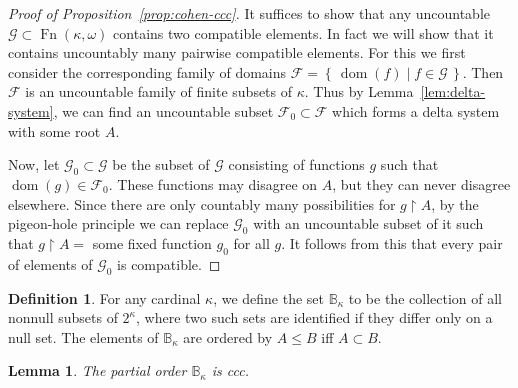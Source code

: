 \documentclass[11pt,oneside]{amsbook}
\newcommand{\set}[1]{\left\{\,#1\,\right\}}
\DeclareMathOperator{\dom}{dom}
\DeclareMathOperator{\Fn}{Fn}
\theoremstyle{definition}
\theoremstyle{plain}
\newtheorem{lem}[thm]{Lemma}
\theoremstyle{definition}
\newtheorem{defn}[thm]{Definition}
\theoremstyle{remark}
\begin{document}
\begin{proof}[Proof of Proposition~\ref{prop:cohen-ccc}]
  It suffices to show that any uncountable $\mathcal G\subset\Fn(\kappa,\omega)$ contains two compatible elements. In fact we will show that it contains uncountably many pairwise compatible elements. For this we first consider the corresponding family of domains $\mathcal F=\set{\dom(f)\mid f\in\mathcal G}$. Then $\mathcal F$ is an uncountable family of finite subsets of $\kappa$. Thus by Lemma~\ref{lem:delta-system}, we can find an uncountable subset $\mathcal F_0\subset\mathcal F$ which forms a delta system with some root $A$.

  Now, let $\mathcal G_0\subset\mathcal G$ be the subset of $\mathcal G$ consisting of functions $g$ such that $\dom(g)\in\mathcal F_0$. These functions may disagree on $A$, but they can never disagree elsewhere. Since there are only countably many possibilities for $g\restriction A$, by the pigeon-hole principle we can replace $\mathcal G_0$ with an uncountable subset of it such that $g\restriction A=$ some fixed function $g_0$ for all $g$. It follows from this that every pair of elements of $\mathcal G_0$ is compatible.
\end{proof}

\begin{defn}
  For any cardinal $\kappa$, we define the set $\mathbb B_\kappa$ to be the collection of all nonnull subsets of $2^\kappa$, where two such sets are identified if they differ only on a null set. The elements of $\mathbb B_\kappa$ are ordered by $A\leq B$ iff $A\subset B$.
\end{defn}

\begin{lem}
  The partial order $\mathbb B_\kappa$ is ccc.
\end{lem}
\end{document}
